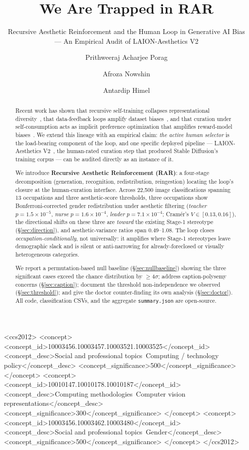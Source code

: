 \documentclass[manuscript, nonacm, screen, review]{acmart}
\title{We Are Trapped in RAR}
\subtitle{Recursive Aesthetic Reinforcement and the Human Loop in Generative AI Bias --- An Empirical Audit of LAION-Aesthetics V2}
\author{Prithweeraj Acharjee Porag}
\affiliation{%
  \institution{University of Toledo}
  \city{Toledo}
  \state{OH}
  \country{USA}
}
\author{Afroza Nowshin}
\affiliation{%
  \institution{University of Toledo}
  \city{Toledo}
  \state{OH}
  \country{USA}
}
\author{Antardip Himel}
\affiliation{%
  \institution{University of Toledo}
  \city{Toledo}
  \state{OH}
  \country{USA}
}
\begin{document}
\begin{abstract}
Recent work has shown that recursive self-training collapses representational diversity~\cite{shumailov2024curse}, that data-feedback loops amplify dataset biases~\cite{taori2022data}, and that curation under self-consumption acts as implicit preference optimization that amplifies reward-model biases~\cite{ferbach2024selfconsuming}. We extend this lineage with an empirical claim: \emph{the active human selector} is the load-bearing component of the loop, and one specific deployed pipeline --- LAION-Aesthetics V2~\cite{schuhmann2022laion}, the human-rated curation step that produced Stable Diffusion's training corpus --- can be audited directly as an instance of it.

We introduce \textbf{Recursive Aesthetic Reinforcement (RAR)}: a four-stage decomposition (generation, recognition, redistribution, reingestion) locating the loop's closure at the human-curation interface. Across 22{,}500 image classifications spanning 13 occupations and three aesthetic-score thresholds, three occupations show Bonferroni-corrected gender redistribution under aesthetic filtering (\emph{teacher} \(p\!=\!1.5\!\times\!10^{-5}\), \emph{nurse} \(p\!=\!1.6\!\times\!10^{-4}\), \emph{leader} \(p\!=\!7.1\!\times\!10^{-4}\); Cramér's $V\!\in\![0.13, 0.16]$), the directional shifts on these three are \emph{toward} the existing Stage-1 stereotype (\S\ref{sec:direction}), and aesthetic-variance ratios span 0.49--1.08. The loop closes \emph{occupation-conditionally}, not universally: it amplifies where Stage-1 stereotypes leave demographic slack and is silent or anti-narrowing for already-foreclosed or visually heterogeneous categories.

We report a permutation-based null baseline (\S\ref{sec:nullbaseline}) showing the three significant cases exceed the chance distribution by $\geq 4\sigma$; address caption-polysemy concerns (\S\ref{sec:caption}); document the threshold non-independence we observed (\S\ref{sec:threshold}); and give the doctor counter-finding its own analysis (\S\ref{sec:doctor}). All code, classification CSVs, and the aggregate \texttt{summary.json} are open-source.
\end{abstract}

\begin{CCSXML}
<ccs2012>
   <concept>
       <concept_id>10003456.10003457.10003521.10003525</concept_id>
       <concept_desc>Social and professional topics~Computing / technology policy</concept_desc>
       <concept_significance>500</concept_significance>
   </concept>
   <concept>
       <concept_id>10010147.10010178.10010187</concept_id>
       <concept_desc>Computing methodologies~Computer vision representations</concept_desc>
       <concept_significance>300</concept_significance>
   </concept>
   <concept>
       <concept_id>10003456.10003462.10003480</concept_id>
       <concept_desc>Social and professional topics~Gender</concept_desc>
       <concept_significance>500</concept_significance>
   </concept>
</ccs2012>
\end{CCSXML}
\end{document}
